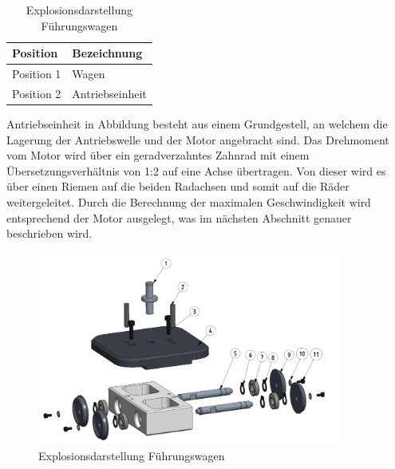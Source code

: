 \documentclass[../../main.tex]{subfiles}
\begin{document}
\begin{table}[H]
\begin{table}[H]
    \begin{table}[H] \centering
        \begin{tabular}{|l|l|}
        \hline
        \textbf{Position} & \textbf{Bezeichnung}\\
        \hline
        Position 1          & Wagen\\
         \hline
        Position 2          & Antriebseinheit\\
        \hline
        \end{tabular}

    Antriebseinheit in Abbildung besteht aus einem Grundgestell, an welchem die Lagerung der Antriebswelle und der Motor angebracht sind. Das Drehmoment vom Motor wird über ein geradverzahntes Zahnrad mit einem Übersetzungsverhältnis von 1:2 auf eine Achse übertragen. Von dieser wird es über einen Riemen auf die beiden Radachsen und somit auf die Räder weitergeleitet. Durch die Berechnung der maximalen Geschwindigkeit wird entsprechend der Motor ausgelegt, was im nächsten Abschnitt genauer beschrieben wird.

    \begin{figure}[H] %
        \centering
        \includegraphics[width=0.9\textwidth]{Fuehrungswagen.png}
        \caption{Explosionsdarstellung Führungswagen}
        \label{fig:antriebseinheit}
    \end{figure} 


\end{table}
\end{table}
\end{table}
\end{document}
